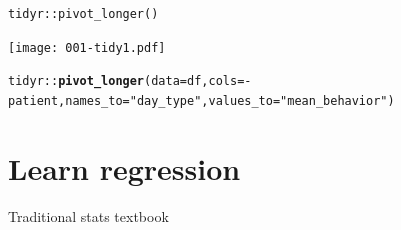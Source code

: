 \documentclass[10pt]{beamer}\usepackage[]{graphicx}\usepackage[]{color}
\makeatletter
\newcommand{\hlstr}[1]{\textcolor[rgb]{0.192,0.494,0.8}{#1}}%
\newcommand{\hlopt}[1]{\textcolor[rgb]{0,0,0}{#1}}%
\newcommand{\hlstd}[1]{\textcolor[rgb]{0.345,0.345,0.345}{#1}}%
\newcommand{\hlkwc}[1]{\textcolor[rgb]{0.333,0.667,0.333}{#1}}%
\newcommand{\hlkwd}[1]{\textcolor[rgb]{0.737,0.353,0.396}{\textbf{#1}}}%
\newenvironment{kframe}{%
 \def\at@end@of@kframe{}%
 \ifinner\ifhmode%
  \def\at@end@of@kframe{\end{minipage}}%
  \begin{minipage}{\columnwidth}%
 \fi\fi%
 \def\FrameCommand##1{\hskip\@totalleftmargin \hskip-\fboxsep
 \colorbox{shadecolor}{##1}\hskip-\fboxsep
     \hskip-\linewidth \hskip-\@totalleftmargin \hskip\columnwidth}%
 \MakeFramed {\advance\hsize-\width
   \@totalleftmargin\z@ \linewidth\hsize
   \@setminipage}}%
 {\par\unskip\endMakeFramed%
 \at@end@of@kframe}
\newenvironment{knitrout}{}{} %
\makeatother
\begin{document}
\begin{frame}[fragile]{\texttt{tidyr::pivot\_longer()}}
	
	
	
	\texttt{[image: 001-tidy1.pdf]}
	
	
\begin{knitrout}\tiny
{}\color{fgcolor}\begin{kframe}
\begin{alltt}
\hlstd{tidyr}\hlopt{::}\hlkwd{pivot_longer}\hlstd{(}\hlkwc{data} \hlstd{= df,} \hlkwc{cols} \hlstd{=} \hlopt{-}\hlstd{patient,} \hlkwc{names_to} \hlstd{=} \hlstr{"day_type"}\hlstd{,} \hlkwc{values_to} \hlstd{=} \hlstr{"mean_behavior"}\hlstd{)}
\end{alltt}
\end{kframe}
\end{knitrout}
	
	
\end{frame}



\section{Learn regression}


\begin{frame}{Traditional stats textbook}
\end{frame}
\end{document}
